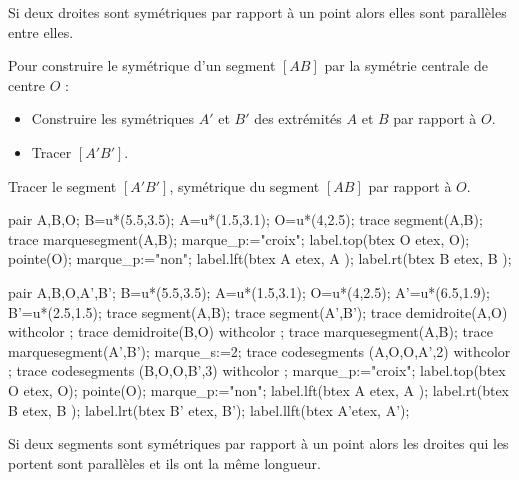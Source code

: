 \begin{propriete}[\admise]
    Si deux droites sont symétriques par rapport à un point alors elles sont parallèles entre elles.
\end{propriete}

\begin{methode}
    Pour construire le symétrique d'un segment $[AB]$ par la symétrie centrale de centre $O$ :
    \begin{itemize}
        \item Construire les symétriques $A'$ et $B'$ des extrémités $A$ et $B$ par rapport à $O$.
        \item Tracer $[A'B']$.
    \end{itemize}
    \exercice
    Tracer le segment $[A'B']$, symétrique du segment $[AB]$ par rapport à $O$.
    
    \bigskip
    \begin{Geometrie}[CoinHD={(8u,4u)}]
        pair A,B,O;
        B=u*(5.5,3.5);
        A=u*(1.5,3.1);
        O=u*(4,2.5);
        trace segment(A,B);
        trace marquesegment(A,B);
        marque_p:="croix";
        label.top(btex O etex, O);
        pointe(O);
        marque_p:="non";
        label.lft(btex A etex, A );
        label.rt(btex B etex, B );
    \end{Geometrie}
    \correction
    \begin{Geometrie}[CoinHD={(8u,4u)}]
        pair A,B,O,A',B';
        B=u*(5.5,3.5);
        A=u*(1.5,3.1);
        O=u*(4,2.5);
        A'=u*(6.5,1.9);
        B'=u*(2.5,1.5);
        trace segment(A,B);
        trace segment(A',B');
        trace demidroite(A,O) withcolor \myMetapostGreen;
        trace demidroite(B,O) withcolor \myMetapostGreen;
        trace marquesegment(A,B);
        trace marquesegment(A',B');
        marque_s:=2;
        trace codesegments (A,O,O,A',2) withcolor \myMetapostGreen;
        trace codesegments (B,O,O,B',3) withcolor \myMetapostGreen;
        marque_p:="croix";
        label.top(btex O etex, O);
        pointe(O);
        marque_p:="non";
        label.lft(btex A etex, A );
        label.rt(btex B etex, B );
        label.lrt(btex B' etex, B');
        label.llft(btex A'etex, A');
    \end{Geometrie}
\end{methode}

\begin{propriete}[\admise]
    Si deux segments sont symétriques par rapport à un point alors les droites qui les portent sont parallèles et ils ont la même longueur.
\end{propriete}

